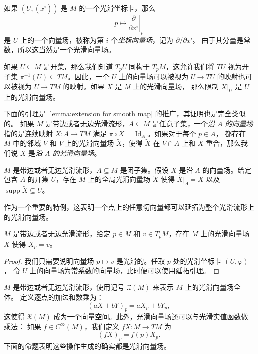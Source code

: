 \documentclass[fontset=none]{Notes}
\DeclareMathOperator\supp{supp}
\DeclareMathOperator\Id{Id}
\begin{document}
\begin{example}[坐标向量场]
  如果 $(U,(x^i))$ 是 $M$ 的一个光滑坐标卡，那么
  \[
    p\mapsto \left.\frac{\partial}{\partial x^i}\right|_p
  \]
  是 $U$ 上的一个向量场，被称为第 $i$ 个\emph{坐标向量场}，记为 $\partial/\partial x^i$。
  由于其分量是常数，所以这当然是一个光滑向量场。
\end{example}

如果 $U\subseteq M$ 是开集，那么我们知道 $T_pU$ 同构于 $T_pM$，这允许我们将
$TU$ 视为开子集 $\pi^{-1}(U)\subseteq TM$。因此，一个 $U$ 上的向量场可以被视为
$U\to TU$ 的映射也可以被视为 $U\to TM$ 的映射。如果 $X$ 是 $M$ 上的光滑向量场，
那么限制 $X|_U$ 是 $U$ 上的光滑向量场。

下面的引理是 \autoref{lemma:extension for smooth map} 的推广，其证明也是完全类似的。
如果 $M$ 是带边或者无边光滑流形，$A\subseteq M$ 是任意子集，一个\emph{沿 $A$ 的向量场}
指的是连续映射 $X:A\to TM$ 满足 $\pi\circ X=\Id_A$。如果对于每个 $p\in A$，
都存在 $M$ 中的邻域 $V$ 和 $V$ 上的光滑向量场 $\tilde X$，使得 $\tilde X$
在 $V\cap A$ 上和 $X$ 重合，那么我们说 $X$ 是\emph{沿 $A$ 的光滑向量场}。

\begin{lemma}[向量场的延拓引理]
  $M$ 是带边或者无边光滑流形，$A\subseteq M$ 是闭子集。假设 $X$ 是沿 $A$ 的向量场。给定
  包含 $A$ 的开集 $U$，存在 $M$ 上的全局光滑向量场 $\tilde X$ 使得 $\tilde X|_A=X$
  以及 $\supp \tilde X\subseteq U$。
\end{lemma}

作为一个重要的特例，这表明一个点上的任意切向量都可以延拓为整个光滑流形上的光滑向量场。

\begin{proposition}
  $M$ 是带边或者无边光滑流形，给定 $p\in M$ 和 $v\in T_pM$，存在 $M$ 上的光滑向量场 $X$
  使得 $X_p=v$。
\end{proposition}
\begin{proof}
  我们只需要说明向量场 $p\mapsto v$ 是光滑的。任取 $p$ 处的光滑坐标卡 $(U,\varphi)$，
  令 $U$ 上的向量场为常系数的向量场，此时便可以使用延拓引理。
\end{proof}
 
$M$ 是带边或者无边光滑流形，使用记号 $\mathfrak{X}(M)$ 来表示 $M$ 上的光滑向量场全体。
定义逐点的加法和数乘为：
\[
  (aX+bY)_p=aX_p+bY_p,
\]
这使得 $\mathfrak X(M)$ 成为一个向量空间。此外，光滑向量场还可以与光滑实值函数做乘法：
如果 $f\in C^\infty(M)$，我们定义 $fX:M\to TM$ 为
\[
  (fX)_p=f(p)X_p.
\]
下面的命题表明这些操作生成的确实都是光滑向量场。
\end{document}
